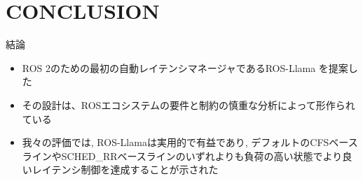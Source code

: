 
\section{CONCLUSION}
\label{sec: conclusion}

\begin{frame}{結論}
    \begin{itemize}
        \item ROS 2のための最初の自動レイテンシマネージャであるROS-Llama を提案した
        \item その設計は、ROSエコシステムの要件と制約の慎重な分析によって形作られている
        \item 我々の評価では, ROS-Llamaは実用的で有益であり, デフォルトのCFSベースラインやSCHED\_RRベースラインのいずれよりも負荷の高い状態でより良いレイテンシ制御を達成することが示された
    \end{itemize}
\end{frame}
